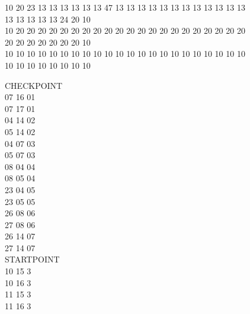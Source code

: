\begin{figure}[h]
\begin{minipage}{1.0\textwidth}
\begin{minipage}[t]{0.6\textwidth}
\begin{spacing}{1.0}
10 20 23 13 13 13 13 13 13 47 13 13 13 13 13 13 13 13 13 13 13 13 13 13 13 13 13 24 20 10\\
10 20 20 20 20 20 20 20 20 20 20 20 20 20 20 20 20 20 20 20 20 20 20 20 20 20 20 20 20 10\\
10 10 10 10 10 10 10 10 10 10 10 10 10 10 10 10 10 10 10 10 10 10 10 10 10 10 10 10 10 10\\
\fontnormal
\end{spacing}
\label{fig:map_in_ascii}
\end{minipage}
\qquad
\begin{minipage}[t]{0.2\textwidth}
\begin{spacing}{1.0}
\fontsmall
CHECKPOINT\\
07 16 01\\
07 17 01\\
04 14 02\\ 
05 14 02\\
04 07 03\\
05 07 03\\
08 04 04\\
08 05 04\\
23 04 05\\
23 05 05\\
26 08 06\\
27 08 06\\
26 14 07\\
27 14 07\\
STARTPOINT\\
10 15 3\\
10 16 3\\
11 15 3\\
 11 16 3\\



\end{spacing}
\end{minipage}
\end{minipage}
\end{figure}
